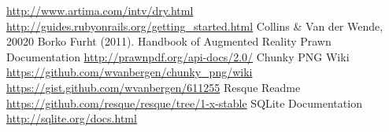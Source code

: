 \begin{thebibliography}{99999}
\singlespace\normalsize

 \url{http://www.artima.com/intv/dry.html}
 \url{http://guides.rubyonrails.org/getting_started.html}
 Collins \& Van der Wende, 20020
 Borko Furht (2011). Handbook of Augmented Reality
 Prawn Documentation \url{http://prawnpdf.org/api-docs/2.0/}
 Chunky PNG Wiki \url{https://github.com/wvanbergen/chunky_png/wiki}
 \url{https://gist.github.com/wvanbergen/611255}
 Resque Readme \url{https://github.com/resque/resque/tree/1-x-stable}
 SQLite Documentation \url{http://sqlite.org/docs.html}


\end{thebibliography}
